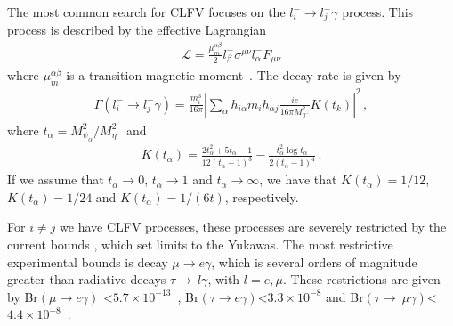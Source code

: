 \documentclass[12pt]{article}
\begin{document}
The most common search for CLFV focuses on the $l^{-}_{i} \to l^{-}_{j} \gamma$ process. This process is described by the effective Lagrangian
%
\begin{align}
    \mathcal{L} = \frac{\mu_{m}^{\alpha \beta}}{2} l^{-}_{\beta} \sigma^{\mu \nu} l^{-}_{\alpha} F_{\mu \nu}
\end{align}
%
where $\mu_{m}^{\alpha \beta}$ is a transition magnetic moment~\cite{Toma:2013zsa}.
The decay rate is given by~\cite{Lavoura:2003xp}
%
\begin{align}
 \Gamma(l^{-}_{i} \to l^{-}_{j} \gamma) = \frac{m^{3}_{i}}{16 \pi} \left| \sum_{\alpha} h_{i \alpha} m_{i} h_{\alpha j} \frac{i e}{16 \pi M^{2}_{\eta^{-}}} K(t_{k}) \right|^{2}\,, 
\end{align}
%
where $t_{\alpha} = M^{2}_{\psi_{\alpha}}/M^{2}_{\eta^{-}}$ and
%
\begin{align}
    K(t_{\alpha}) = \frac{2t_{\alpha}^{2}+5t_{\alpha}-1}{12(t_{\alpha}-1)^{3}} - \frac{t_{\alpha}^{2}\log t_{\alpha}}{2(t_{\alpha}-1)^{4}}\,.
\end{align}
%
If we assume that $t_{\alpha} \to 0$, $t_{\alpha} \to 1$ and $t_{\alpha} \to \infty$, we have that $K(t_{\alpha}) = 1/12$, $K(t_{\alpha}) = 1/24$ and $K(t_{\alpha}) = 1/(6t)$, respectively.

For $i \neq j$ we have CLFV processes, these processes are severely restricted by the current bounds , which set limits to the Yukawas. The most restrictive experimental bounds is decay $\mu \to e \gamma$, which is several orders of magnitude greater than radiative decays $\tau \to~l\gamma$, with $l = e, \mu$. These restrictions are given by Br$(\mu \to e\gamma)$ \textless $5.7 \times 10^{-13} $~\cite{Adam:2013mnn}, Br$(\tau \to e\gamma) $\textless$ 3.3 \times 10^{-8}$ and Br$(\tau \to~\mu\gamma) $\textless$ 4.4 \times 10^{-8}$~\cite{Aubert:2009ag, Bona:2007qt, Miyazaki:2012mx}. 
\end{document}
